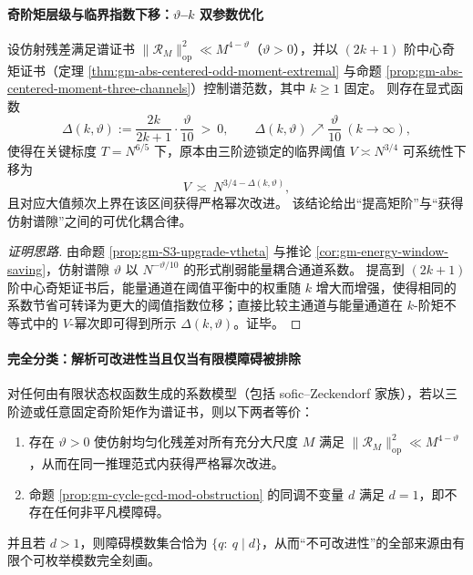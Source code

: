 \paragraph{奇阶矩层级与临界指数下移：\texorpdfstring{$\vartheta$}{vtheta}--\texorpdfstring{$k$}{k} 双参数优化}
\begin{proposition}\label{prop:gm-critical-exponent-shift-k-vtheta}
设仿射残差满足谱证书
\(
\|\mathcal{R}_M\|_{\mathrm{op}}^2\ll M^{4-\vartheta}
\)（\(\vartheta>0\)），并以 \((2k+1)\) 阶中心奇矩证书（定理 \ref{thm:gm-abs-centered-odd-moment-extremal} 与命题 \ref{prop:gm-abs-centered-moment-three-channels}）控制谱范数，其中 \(k\ge 1\) 固定。
则存在显式函数
\[
\Delta(k,\vartheta):=\frac{2k}{2k+1}\cdot\frac{\vartheta}{10}\ >\ 0,
\qquad
\Delta(k,\vartheta)\nearrow \frac{\vartheta}{10}\ (k\to\infty),
\]
使得在关键标度 \(T=N^{6/5}\) 下，原本由三阶迹锁定的临界阈值 \(V\asymp N^{3/4}\) 可系统性下移为
\[
V\ \asymp\ N^{3/4-\Delta(k,\vartheta)},
\]
且对应大值频次上界在该区间获得严格幂次改进。
该结论给出“提高矩阶”与“获得仿射谱隙”之间的可优化耦合律。
\end{proposition}


\begin{proof}[证明思路]
由命题 \ref{prop:gm-S3-upgrade-vtheta} 与推论 \ref{cor:gm-energy-window-saving}，仿射谱隙 \(\vartheta\) 以 \(N^{-\vartheta/10}\) 的形式削弱能量耦合通道系数。
提高到 \((2k+1)\) 阶中心奇矩证书后，能量通道在阈值平衡中的权重随 \(k\) 增大而增强，使得相同的系数节省可转译为更大的阈值指数位移；直接比较主通道与能量通道在 \(k\)-阶矩不等式中的 \(V\)-幂次即可得到所示 \(\Delta(k,\vartheta)\)。证毕。
\end{proof}

\paragraph{完全分类：解析可改进性当且仅当有限模障碍被排除}
\begin{theorem}\label{thm:gm-improvability-iff-d1}
对任何由有限状态权函数生成的系数模型（包括 sofic--Zeckendorf 家族），若以三阶迹或任意固定奇阶矩作为谱证书，则以下两者等价：
\begin{enumerate}
  \item 存在 \(\vartheta>0\) 使仿射均匀化残差对所有充分大尺度 \(M\) 满足
  \(
  \|\mathcal{R}_M\|_{\mathrm{op}}^2\ll M^{4-\vartheta}
  \)，从而在同一推理范式内获得严格幂次改进。
  \item 命题 \ref{prop:gm-cycle-gcd-mod-obstruction} 的同调不变量 \(d\) 满足 \(d=1\)，即不存在任何非平凡模障碍。
\end{enumerate}
并且若 \(d>1\)，则障碍模数集合恰为 \(\{q:\ q\mid d\}\)，从而“不可改进性”的全部来源由有限个可枚举模数完全刻画。
\end{theorem}

